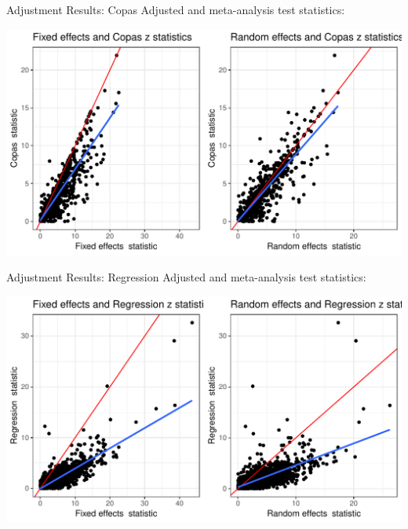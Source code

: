 \documentclass[english]{beamer}\usepackage[]{graphicx}\usepackage[]{color}
\makeatletter
\def\maxwidth{ %
  \ifdim\Gin@nat@width>\linewidth
    \linewidth
  \else
    \Gin@nat@width
  \fi
}
\newenvironment{knitrout}{}{} %
\makeatother
\begin{document}
\begin{frame}[fragile]{Adjustment Results: Copas}
Adjusted and meta-analysis test statistics:

\vspace{-3mm}
\begin{knitrout}
\color{fgcolor}
\includegraphics[width=\maxwidth]{figure/unnamed-chunk-16-1} 

\end{knitrout}
\end{frame}


\begin{frame}[fragile]{Adjustment Results: Regression}
Adjusted and meta-analysis test statistics:

\vspace{-3mm}
\begin{knitrout}
\color{fgcolor}
\includegraphics[width=\maxwidth]{figure/unnamed-chunk-17-1} 

\end{knitrout}
\end{frame}
\end{document}
